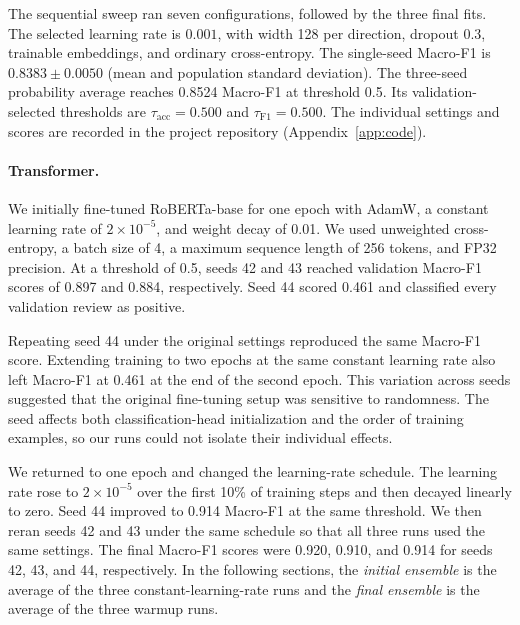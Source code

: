 The sequential sweep ran seven configurations, followed by the three final fits. The selected learning rate is $0.001$, with width 128 per direction, dropout 0.3, trainable embeddings, and ordinary cross-entropy. The single-seed Macro-F1 is $0.8383\pm0.0050$ (mean and population standard deviation). The three-seed probability average reaches 0.8524 Macro-F1 at threshold 0.5. Its validation-selected thresholds are $\tau_{\mathrm{acc}}=0.500$ and $\tau_{\mathrm{F1}}=0.500$. The individual settings and scores are recorded in the project repository (Appendix~\ref{app:code}).

\paragraph{Transformer.}
We initially fine-tuned RoBERTa-base for one epoch with AdamW, a
constant learning rate of $2\times10^{-5}$, and weight decay of 0.01.
We used unweighted cross-entropy, a batch size of 4, a maximum sequence
length of 256 tokens, and FP32 precision. At a threshold of 0.5, seeds
42 and 43 reached validation Macro-F1 scores of 0.897 and 0.884,
respectively. Seed 44 scored 0.461 and classified every validation
review as positive.

Repeating seed 44 under the original settings reproduced the same
Macro-F1 score. Extending training to two epochs at the same constant
learning rate also left Macro-F1 at 0.461 at the end of the second
epoch. This variation across seeds suggested that the original
fine-tuning setup was sensitive to randomness. The seed affects both
classification-head initialization and the order of training examples,
so our runs could not isolate their individual effects.

We returned to one epoch and changed the learning-rate schedule. The
learning rate rose to $2\times10^{-5}$ over the first 10\% of training
steps and then decayed linearly to zero. Seed 44 improved to 0.914
Macro-F1 at the same threshold. We then reran seeds 42 and 43 under the
same schedule so that all three runs used the same settings. The final
Macro-F1 scores were 0.920, 0.910, and 0.914 for seeds 42, 43, and 44,
respectively.
In the following sections, the \emph{initial ensemble} is the average of the three constant-learning-rate runs and the \emph{final ensemble} is the average of the three warmup runs.
